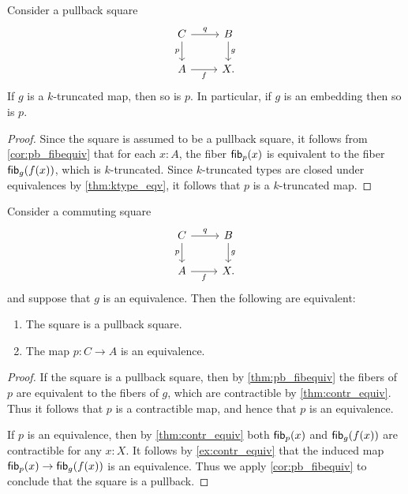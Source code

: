 \begin{cor}\label{cor:pb_trunc}
Consider a pullback square
\begin{equation*}
\begin{tikzcd}
C \arrow[r,"q"] \arrow[d,swap,"p"] & B \arrow[d,"g"] \\
A \arrow[r,swap,"f"] & X.
\end{tikzcd}
\end{equation*}
If $g$ is a $k$-truncated map, then so is $p$. In particular, if $g$ is an embedding then so is $p$.
\end{cor}

\begin{proof}
Since the square is assumed to be a pullback square, it follows from \cref{cor:pb_fibequiv} that for each $x:A$, the fiber $\mathsf{fib}_{p}(x)$ is equivalent to the fiber $\mathsf{fib}_{g}(f(x))$, which is $k$-truncated. Since $k$-truncated types are closed under equivalences by \cref{thm:ktype_eqv}, it follows that $p$ is a $k$-truncated map.
\end{proof}

\begin{cor}\label{cor:pb_equiv}
Consider a commuting square
\begin{equation*}
\begin{tikzcd}
C \arrow[r,"q"] \arrow[d,swap,"p"] & B \arrow[d,"g"] \\
A \arrow[r,swap,"f"] & X.
\end{tikzcd}
\end{equation*}
and suppose that $g$ is an equivalence. Then the following are equivalent:
\begin{enumerate}
\item The square is a pullback square.
\item The map $p:C\to A$ is an equivalence.
\end{enumerate}
\end{cor}

\begin{proof}
If the square is a pullback square, then by \cref{thm:pb_fibequiv} the fibers of $p$ are equivalent to the fibers of $g$, which are contractible by \cref{thm:contr_equiv}. Thus it follows that $p$ is a contractible map, and hence that $p$ is an equivalence.

If $p$ is an equivalence, then by \cref{thm:contr_equiv} both $\mathsf{fib}_{p}(x)$ and $\mathsf{fib}_{g}(f(x))$ are contractible for any $x:X$. It follows by \cref{ex:contr_equiv} that the induced map $\mathsf{fib}_{p}(x)\to\mathsf{fib}_{g}(f(x))$ is an equivalence. Thus we apply \cref{cor:pb_fibequiv} to conclude that the square is a pullback.
\end{proof}

